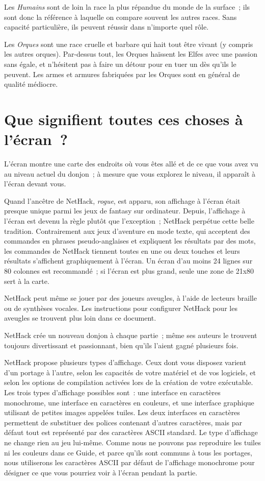 \documentclass[titlepage]{article}
\begin{document}
Les \textit{Humains} sont de loin la race la plus répandue du monde de la
surface~; ils sont donc la référence à laquelle on compare souvent les
autres races.
Sans capacité particulière, ils peuvent réussir dans n'importe quel rôle.


Les \textit{Orques} sont une race cruelle et barbare qui hait tout être vivant
(y compris les autres orques).
Par-dessus tout, les Orques haïssent les Elfes avec une passion sans égale,
et n'hésitent pas à faire un détour pour en tuer un dès qu'ils le peuvent.
Les armes et armures fabriquées par les Orques sont en général de qualité
médiocre.

\section{Que signifient toutes ces choses à l'écran~?}



L'écran montre une carte des endroits où vous êtes allé et de ce que vous
avez vu au niveau actuel du donjon~; à mesure que vous explorez le niveau,
il apparaît à l'écran devant vous.


Quand l'ancêtre de NetHack, \textit{rogue}, est apparu, son affichage à
l'écran était presque unique parmi les jeux de fantasy sur ordinateur.
Depuis, l'affichage à l'écran est devenu la règle plutôt que l'exception~;
NetHack perpétue cette belle tradition.
Contrairement aux jeux d'aventure en mode texte, qui acceptent des
commandes en phrases pseudo-anglaises et expliquent les résultats par des
mots, les commandes de NetHack tiennent toutes en une ou deux touches et
leurs résultats s'affichent graphiquement à l'écran.
Un écran d'au moins 24 lignes sur 80 colonnes est recommandé~; si l'écran
est plus grand, seule une zone de 21x80 sert à la carte.


NetHack peut même se jouer par des joueurs aveugles, à l'aide de lecteurs
braille ou de synthèses vocales.
Les instructions pour configurer NetHack pour les aveugles se trouvent plus
loin dans ce document.


NetHack crée un nouveau donjon à chaque partie~; même ses auteurs le
trouvent toujours divertissant et passionnant, bien qu'ils l'aient gagné
plusieurs fois.


NetHack propose plusieurs types d'affichage.
Ceux dont vous disposez varient d'un portage à l'autre, selon les capacités
de votre matériel et de vos logiciels, et selon les options de compilation
activées lors de la création de votre exécutable.
Les trois types d'affichage possibles sont~: une interface en caractères
monochrome, une interface en caractères en couleurs, et une interface
graphique utilisant de petites images appelées tuiles.
Les deux interfaces en caractères permettent de substituer des polices
contenant d'autres caractères, mais par défaut tout est représenté par des
caractères ASCII standard.
Le type d'affichage ne change rien au jeu lui-même.
Comme nous ne pouvons pas reproduire les tuiles ni les couleurs dans ce
Guide, et parce qu'ils sont communs à tous les portages, nous utiliserons
les caractères ASCII par défaut de l'affichage monochrome pour désigner ce
que vous pourriez voir à l'écran pendant la partie.
\end{document}
